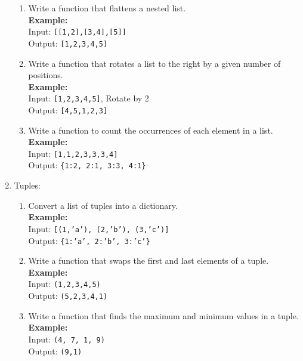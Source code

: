 \documentclass{article}
\begin{document}
\begin{enumerate}
\begin{enumerate}
        \item Write a function that flattens a nested list.\\
        \textbf{Example:} \\
        Input: \texttt{[[1,2],[3,4],[5]]} \\
        Output: \texttt{[1,2,3,4,5]}
        
        \item Write a function that rotates a list to the right by a given number of positions.\\
        \textbf{Example:} \\
        Input: \texttt{[1,2,3,4,5]}, Rotate by 2 \\
        Output: \texttt{[4,5,1,2,3]}    
        
        \item Write a function to count the occurrences of each element in a list.\\
        \textbf{Example:} \\
        Input: \texttt{[1,1,2,3,3,3,4]} \\
        Output: \texttt{\{1:2, 2:1, 3:3, 4:1\}}
        
    \end{enumerate}

    \item Tuples:

    \begin{enumerate}
        \item Convert a list of tuples into a dictionary.\\
        \textbf{Example:} \\
        Input: \texttt{[(1,'a'), (2,'b'), (3,'c')]} \\
        Output: \texttt{\{1:'a', 2:'b', 3:'c'\}}
        
        \item Write a function that swaps the first and last elements of a tuple.\\
        \textbf{Example:} \\
        Input: \texttt{(1,2,3,4,5)} \\
        Output: \texttt{(5,2,3,4,1)}
        
        \item Write a function that finds the maximum and minimum values in a tuple.\\
        \textbf{Example:} \\
        Input: \texttt{(4, 7, 1, 9)} \\
        Output: \texttt{(9,1)}
        

\end{enumerate}
\end{enumerate}
\end{document}
